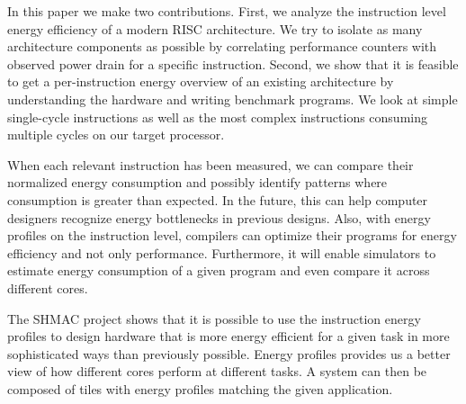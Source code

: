 In this paper we make two contributions. First, we analyze the instruction level
energy efficiency of a modern RISC architecture. We try to isolate as many
architecture components as possible by correlating performance counters with
observed power drain for a specific instruction. Second, we show that it is
feasible to get a per-instruction energy overview of an existing architecture by
understanding the hardware and writing benchmark programs. We look at simple
single-cycle instructions as well as the most complex instructions consuming
multiple cycles on our target processor.

When each relevant instruction has been measured, we can compare their
normalized energy consumption and possibly identify patterns where consumption
is greater than expected. In the future, this can help computer designers
recognize energy bottlenecks in previous designs. Also, with energy profiles on
the instruction level, compilers can optimize their programs for energy
efficiency and not only performance. Furthermore, it will enable simulators to
estimate energy consumption of a given program and even compare it across
different cores.

The SHMAC project shows that it is possible to use the instruction energy
profiles to design hardware that is more energy efficient for a given task in
more sophisticated ways than previously possible. Energy profiles provides us a
better view of how different cores perform at different
tasks\cite{kumar2003single}. A system can then be composed of tiles with energy
profiles matching the given application.



